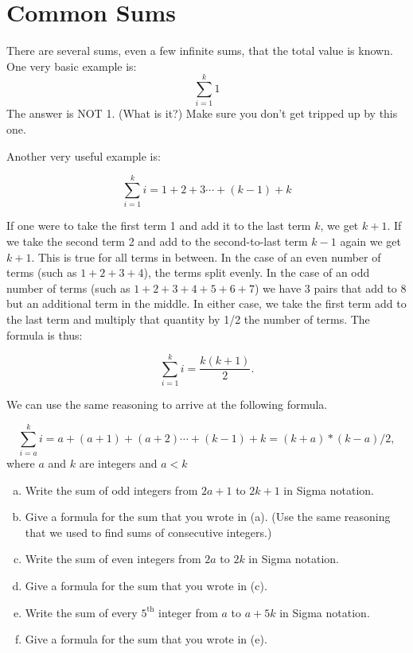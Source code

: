 \section{Common Sums}
There are several sums, even a few infinite sums, that the total value is known. One very basic example is:
\[\sum_{i=1}^{k}1\]
The answer is NOT 1. (What is it?) Make sure you don't get tripped up by this one.

Another very useful example is:

\[\sum_{i=1}^{k}i=1+2+3\cdots+(k-1) + k\]

If one were to take the first term 1 and add it to the last term $k$, we get $k+1$.  If we take the second term 2 and add to the second-to-last term $k-1$ again we get $k+1$.  This is true for all terms in between.  In the case of an even number of terms (such as $1+2+3+4$),  the terms split evenly.  In the case of an odd number of terms (such as $1+2+3+4+5+6+7$) we have 3 pairs that add to 8 but an additional term in the middle.  In either case, we take the first term add to the last term and multiply that quantity by 1/2 the number of terms.  The formula is thus:

\[\sum_{i=1}^{k}i= \frac{k(k+1)}{2}.\] 

We can use the same reasoning to arrive at the following formula.

\[\sum_{i=a}^{k}i=a+(a+1)+(a+2)\cdots+(k-1) + k = (k+a)*(k-a)/2,\] 
where $a$ and $k$ are integers and $a<k$

\begin {exercise}{}
\begin {enumerate}[(a)]
\item 
Write the sum of odd integers from $2a+1$ to $2k+1$ in Sigma notation.
\item
Give a formula for the sum that you wrote in (a).  (Use the same reasoning that we used to find sums of consecutive integers.)
\item 
Write the sum of even integers from $2a$ to $2k$ in Sigma notation.
\item
Give a formula for the sum that you wrote in (c). 
\item 
Write the sum of every $5^{\text{th}}$ integer from $a$ to $a + 5k$ in Sigma notation.
\item
Give a formula for the sum that you wrote in (e). 
\end {enumerate}
\end {exercise}

